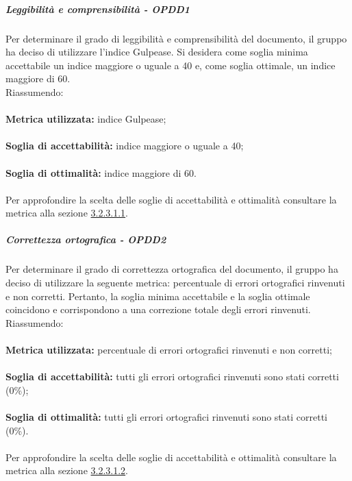 \documentclass[PianoDiQualifica.tex]{subfiles}
\begin{document}
				\subparagraph{Leggibilità e comprensibilità - OPDD1}
				Per determinare il grado di leggibilità e comprensibilità del documento, il gruppo ha deciso di utilizzare l'indice Gulpease. Si desidera come soglia minima accettabile un indice
				maggiore o uguale a 40 e, come soglia ottimale, un indice maggiore di 60. \\
				Riassumendo: \\ \\
				\textbf{Metrica utilizzata:} indice Gulpease; \\ \\
				\textbf{Soglia di accettabilità:} indice maggiore o uguale a 40; \\ \\
				\textbf{Soglia di ottimalità:} indice maggiore di 60. \\ \\
				Per approfondire la scelta delle soglie di accettabilità e ottimalità consultare la metrica alla sezione \hyperlink{leggi_m}{3.2.3.1.1}.
				
				\subparagraph{Correttezza ortografica - OPDD2}
				Per determinare il grado di correttezza ortografica del documento, il gruppo ha deciso di utilizzare la seguente metrica: percentuale di errori ortografici rinvenuti e non corretti.
				Pertanto, la soglia minima accettabile e la soglia ottimale coincidono e corrispondono a una correzione totale degli errori rinvenuti. \\
				Riassumendo: \\ \\
				\textbf{Metrica utilizzata:} percentuale di errori ortografici rinvenuti e non corretti; \\ \\
				\textbf{Soglia di accettabilità:} tutti gli errori ortografici rinvenuti sono stati corretti (0\%); \\ \\
				\textbf{Soglia di ottimalità:} tutti gli errori ortografici rinvenuti sono stati corretti (0\%). \\ \\
				Per approfondire la scelta delle soglie di accettabilità e ottimalità consultare la metrica alla sezione \hyperlink{err_ortografici}{3.2.3.1.2}.
				
\end{document}
